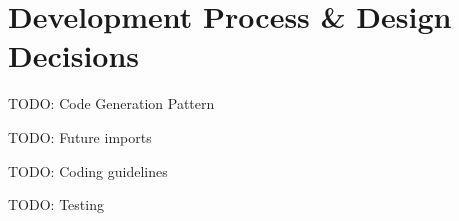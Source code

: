 
\chapter{Development Process \& Design Decisions}

\label{ch:development}

TODO: Code Generation Pattern

TODO: Future imports

TODO: Coding guidelines

TODO: Testing
